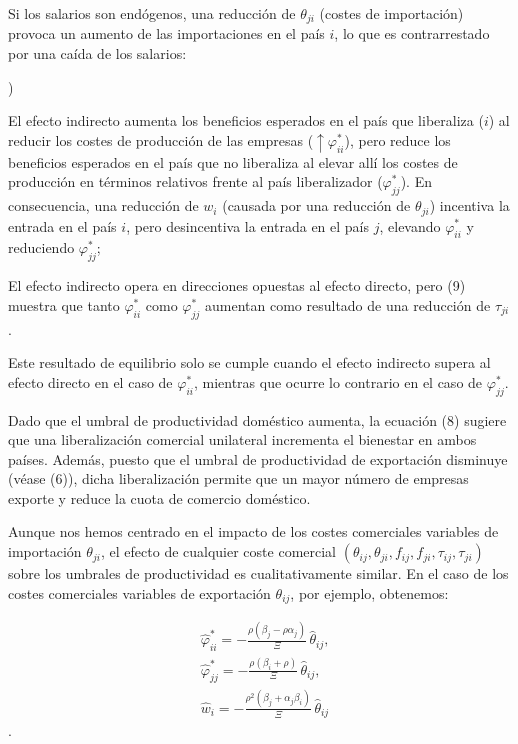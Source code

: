 \documentclass[10pt,a4paper]{article}
\newcounter{alphaitem}
\newenvironment{la}
      {\begin{list}{\alph{alphaitem})}{%
          \usecounter{alphaitem}%
          \setlength{\leftmargin}{1cm}%
          \setlength{\parskip}{3pt}%
          \setlength{\itemsep}{0pt}%
          \setlength{\parsep}{0pt}%
      }}
      {\end{list}}
\begin{document}
Si los salarios son endógenos, una reducción de $\theta_{ji}$ (costes de importación) provoca un aumento de las importaciones en el país $i$, lo que es contrarrestado por una caída de los salarios:
\begin{la}
    \item El efecto indirecto aumenta los beneficios esperados en el país que liberaliza ($i$) al reducir los costes de producción de las empresas ($\uparrow \varphi_{ii}^*$), pero reduce los beneficios esperados en el país que no liberaliza al elevar allí los costes de producción en términos relativos frente al país liberalizador ($\varphi_{jj}^*$). En consecuencia, una reducción de $w_i$ (causada por una reducción de $\theta_{ji}$) incentiva la entrada en el país $i$, pero desincentiva la entrada en el país $j$, elevando $\varphi_{ii}^*$ y reduciendo $\varphi_{jj}^*$;
    \item El efecto indirecto opera en direcciones opuestas al efecto directo, pero (9) muestra que tanto $\varphi_{ii}^*$ como $\varphi_{jj}^*$ aumentan como resultado de una reducción de $\tau_{ji}$.
\end{la}

Este resultado de equilibrio solo se cumple cuando el efecto indirecto supera al efecto directo en el caso de $\varphi_{ii}^*$, mientras que ocurre lo contrario en el caso de $\varphi_{jj}^*$.

Dado que el umbral de productividad doméstico aumenta, la ecuación (8) sugiere que una liberalización comercial unilateral incrementa el bienestar en ambos países. Además, puesto que el umbral de productividad de exportación disminuye (véase (6)), dicha liberalización permite que un mayor número de empresas exporte y reduce la cuota de comercio doméstico.

Aunque nos hemos centrado en el impacto de los costes comerciales variables de importación $\theta_{ji}$, el efecto de cualquier coste comercial $(\theta_{ij}, \theta_{ji}, f_{ij}, f_{ji}, \tau_{ij}, \tau_{ji})$ sobre los umbrales de productividad es cualitativamente similar. En el caso de los costes comerciales variables de exportación $\theta_{ij}$, por ejemplo, obtenemos:

$$\begin{aligned}
    &\hat{\varphi}_{ii}^*=-\frac{\rho(\beta_j-\rho\alpha_j)}{\Xi}\,\hat{\theta}_{ij},\\[1em]
    &\hat{\varphi}_{jj}^*=-\frac{\rho(\beta_i+\rho)}{\Xi}\,\hat{\theta}_{ij},\\[1em]
    &\hat{w}_i=-\frac{\rho^2(\beta_j+\alpha_j\beta_i)}{\Xi}\,\hat{\theta}_{ij}
\end{aligned}$$.
\end{document}
